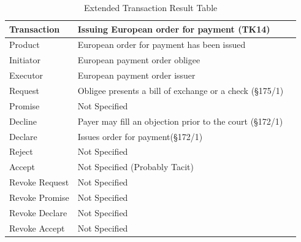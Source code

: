 \begin{landscape}
\begin{table}[h]
\caption{Extended Transaction Result Table}
\label{tab:etrt}
\begin{tabular}{|l||l|l|}
\hline
Transaction  &  Issuing European order for payment (TK14) \\ \hline
Product      &  European order for payment has been issued \\ \hline
Initiator      &  European payment order obligee \\ \hline
Executor       & European payment order issuer \\ \hline
Request        &    Obligee presents a bill of exchange or a check (\S175/1)
  \\ \hline
Promise        &    Not Specified   \\ \hline
Decline        &  Payer may fill an objection prior to the court (\S172/1)  \\ \hline
Declare        &  Issues order for payment(\S172/1)  \\ \hline
Reject         &  Not Specified   \\ \hline
Accept         & Not Specified (Probably Tacit) \\ \hline
Revoke Request & Not Specified    \\ \hline
Revoke Promise & Not Specified  \\ \hline
Revoke Declare & Not Specified      \\ \hline
Revoke Accept  &  Not Specified \\ \hline
\end{tabular}
\end{table}


\end{landscape}
